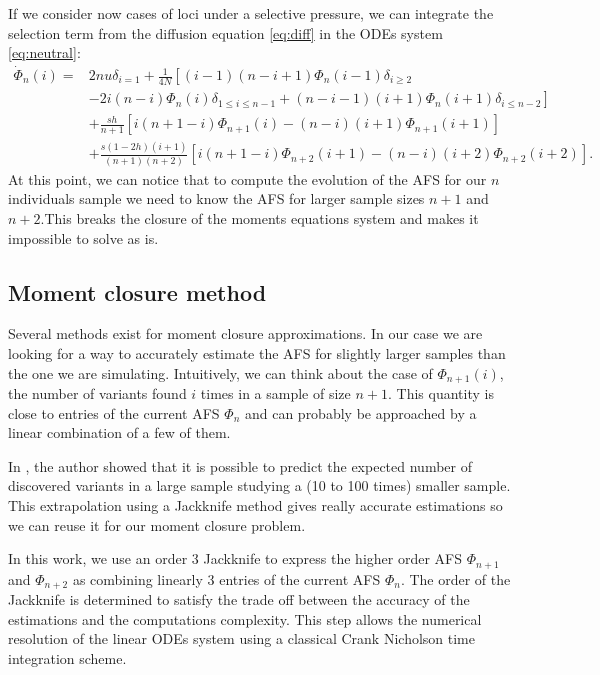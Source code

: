 If we consider now cases of loci under a selective pressure, we can integrate the selection term from the diffusion equation \eqref{eq:diff} in the ODEs system \eqref{eq:neutral}:
\begin{equation}
\begin{split}
\dot \Phi_n(i)=& 2nu  \delta_{i=1} + \frac{1}{4 N} \left[ (i-1)(n-i+1) \Phi_n(i-1)\delta_{i\geq 2} \right.\\
		      & \left.-2i(n-i)\Phi_n(i)\delta_{1\leq i\leq n-1}  + (n-i-1)(i+1)\Phi_n(i+1)\delta_{i\leq n-2} \right]\\
		      &+ \frac{sh}{n+1}\left[i(n+1-i)\Phi_{n+1}(i)-(n-i)(i+1)\Phi_{n+1}(i+1)\right] \\
		      & +\frac{s(1-2h)(i+1)}{(n+1)(n+2)}\left[i(n+1-i)\Phi_{n+2}(i+1)-(n-i)(i+2)\Phi_{n+2}(i+2)\right].
\end{split}
\label{eq:syst_edo_1pop}
\end{equation}
 At this point, we can notice that to compute the evolution of the AFS for our $n$ individuals sample we need to know the AFS for larger sample sizes $n+1$ and $n+2$.This breaks the closure of the moments equations system and makes it impossible to solve as is.
 
\subsection{Moment closure method}
Several methods exist for moment closure approximations. In our case we are looking for a way to accurately estimate the AFS for slightly larger samples than the one we are simulating. Intuitively, we can think about the case of $\Phi_{n+1}(i)$, the number of variants found $i$ times in a sample of size $n+1$. This quantity is close to entries of the current AFS $\Phi_n$ and can probably be approached by a linear combination of a few of them.

In \cite{gravel2014}, the author showed that it is possible to predict the expected number of discovered variants in a large sample studying a (10 to 100 times) smaller sample. This extrapolation using a Jackknife method gives really accurate estimations so we can reuse it for our moment closure problem.

In this work, we use an order 3 Jackknife to express the higher order AFS $\Phi_{n+1}$ and $\Phi_{n+2}$ as combining linearly 3 entries of the current AFS $\Phi_n$. The order of the Jackknife is determined to satisfy the trade off between the accuracy of the estimations and the computations complexity. This step allows the numerical resolution of the linear ODEs system using a classical Crank Nicholson time integration scheme.  

